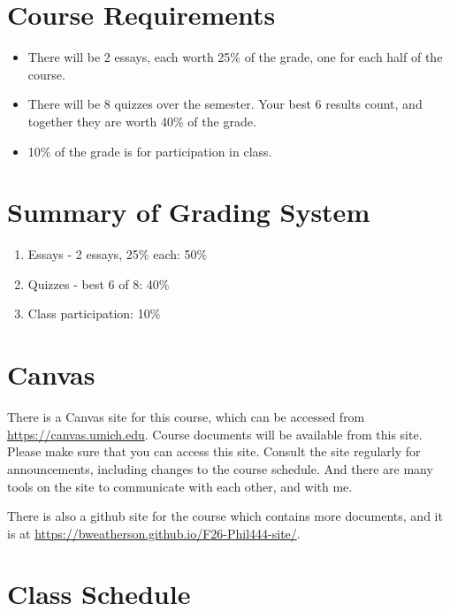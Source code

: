 \documentclass[
  letterpaper,
  DIV=11,
  numbers=noendperiod]{scrartcl}
\providecommand{\tightlist}{%
  \setlength{\itemsep}{0pt}\setlength{\parskip}{0pt}}
\begin{document}
\section{Course Requirements}\label{course-requirements}

\begin{itemize}
\tightlist
\item
  There will be 2 essays, each worth 25\% of the grade, one for each
  half of the course.
\item
  There will be 8 quizzes over the semester. Your best 6 results count,
  and together they are worth 40\% of the grade.
\item
  10\% of the grade is for participation in class.
\end{itemize}

\section{Summary of Grading System}\label{summary-of-grading-system}

\begin{enumerate}
\def\labelenumi{\arabic{enumi}.}
\tightlist
\item
  Essays - 2 essays, 25\% each: 50\%
\item
  Quizzes - best 6 of 8: 40\%
\item
  Class participation: 10\%
\end{enumerate}

\section{Canvas}\label{canvas}

There is a Canvas site for this course, which can be accessed from
\url{https://canvas.umich.edu}. Course documents will be available from
this site. Please make sure that you can access this site. Consult the
site regularly for announcements, including changes to the course
schedule. And there are many tools on the site to communicate with each
other, and with me.

There is also a github site for the course which contains more
documents, and it is at
\url{https://bweatherson.github.io/F26-Phil444-site/}.

\pagebreak

\section{Class Schedule}\label{class-schedule}
\end{document}
